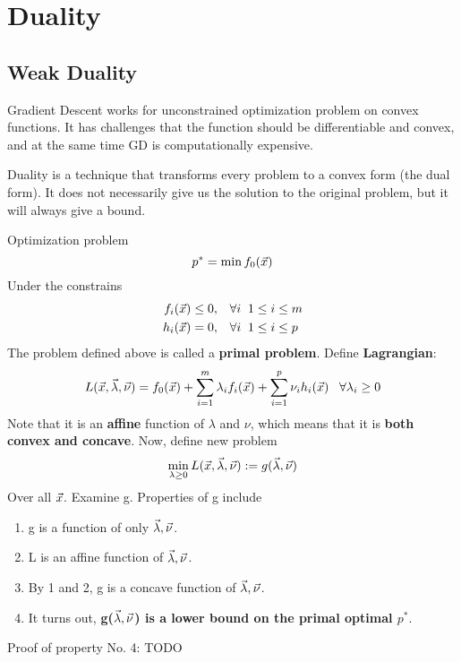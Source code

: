 \section{Duality} %
\label{sec:duality}

\subsection{Weak Duality} %
\label{sub:weak_duality}

\begin{remark}
	Gradient Descent works for unconstrained optimization problem on convex functions. It has challenges that the function should be differentiable and convex, and at the same time GD is computationally expensive. 

	Duality is a technique that transforms every problem to a convex form (the dual form). It does not necessarily give us the solution to the original problem, but it will always give a bound.
\end{remark}

\begin{theorem}[Lagrangian]
	Optimization problem
	\[
p^* = \min f_0(\vec{x})
	\]
	Under the constrains
	\begin{align*}
		f_i(\vec{x})&\le0,\;\;\;\forall i\;\;1\le i\le m\\
		h_i(\vec{x})&=0,\;\;\;\forall i\;\;1\le i\le p
	\end{align*}
	The problem defined above is called a \textbf{primal problem}. Define \textbf{Lagrangian}:
	\[
L(\vec{x},\vec{\lambda},\vec{\nu}) = f_0(\vec{x})+\sum_{i=1}^m \lambda_if_i(\vec{x})+\sum_{i=1}^p\nu_ih_i(\vec{x}) \;\;\; \forall \lambda_i \ge 0
	\]
	Note that it is an \textbf{affine} function of $\lambda$ and $\nu$, which means that it is \textbf{both convex and concave}. Now, define new problem
	\[
\min_{\lambda \ge 0} L(\vec{x},\vec{\lambda},\vec{\nu}) := g(\vec{\lambda},\vec{\nu})
	\]
	Over all $\vec{x}$. Examine g. Properties of g include
	\begin{enumerate}
		\item g is a function of only $\vec{\lambda},\vec{\nu}$.
		\item L is an affine function of $\vec{\lambda},\vec{\nu}$.
		\item By 1 and 2, g is a concave function of $\vec{\lambda},\vec{\nu}$.
		\item It turns out, \textbf{g($\vec{\lambda},\vec{\nu}$) is a lower bound on the primal optimal $p^*$}.
	\end{enumerate}
\end{theorem}
Proof of property No. 4: TODO

